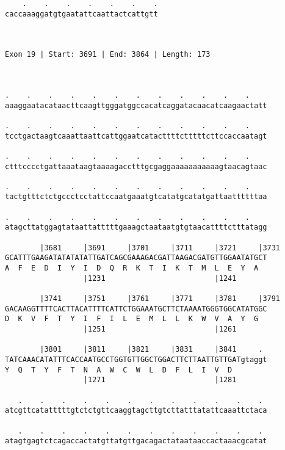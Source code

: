 \documentclass{article}
\begin{document}
\begin{Verbatim}
    .    .    .    .    .    .    .
caccaaaggatgtgaatattcaattactcattgtt
                                   
                                   
 
Exon 19 | Start: 3691 | End: 3864 | Length: 173



.    .    .    .    .    .    .    .    .    .    .    .    
aaaggaatacataacttcaagttgggatggccacatcaggatacaacatcaagaactatt
                                                            
.    .    .    .    .    .    .    .    .    .    .    .    
tcctgactaagtcaaattaattcattggaatcatacttttctttttcttccaccaatagt
                                                            
.    .    .    .    .    .    .    .    .    .    .    .    
ctttcccctgattaaataagtaaaagacctttgcgaggaaaaaaaaaaagtaacagtaac
                                                            
.    .    .    .    .    .    .    .    .    .    .    .    
tactgtttctctgccctcctattccaatgaaatgtcatatgcatatgattaattttttaa
                                                            
.    .    .    .    .    .    .    .    .    .    .    .    
atagcttatggagtataattatttttgaaagctaataatgtgtaacattttctttatagg
                                                            
        |3681     |3691     |3701     |3711     |3721     |3731
GCATTTGAAGATATATATATTGATCAGCGAAAGACGATTAAGACGATGTTGGAATATGCT
A  F  E  D  I  Y  I  D  Q  R  K  T  I  K  T  M  L  E  Y  A  
                  |1231                         |1241       
  
        |3741     |3751     |3761     |3771     |3781     |3791
GACAAGGTTTTCACTTACATTTTCATTCTGGAAATGCTTCTAAAATGGGTGGCATATGGC
D  K  V  F  T  Y  I  F  I  L  E  M  L  L  K  W  V  A  Y  G  
                  |1251                         |1261       
  
        |3801     |3811     |3821     |3831     |3841     . 
TATCAAACATATTTCACCAATGCCTGGTGTTGGCTGGACTTCTTAATTGTTGATgtaggt
Y  Q  T  Y  F  T  N  A  W  C  W  L  D  F  L  I  V  D        
                  |1271                         |1281       
  
   .    .    .    .    .    .    .    .    .    .    .    . 
atcgttcatatttttgtctctgttcaaggtagcttgtcttatttatattcaaattctaca
                                                            
   .    .    .    .    .    .    .    .    .    .    .    . 
atagtgagtctcagaccactatgttatgttgacagactataataaccactaaacgcatat
                                                            

\end{Verbatim}
\end{document}
